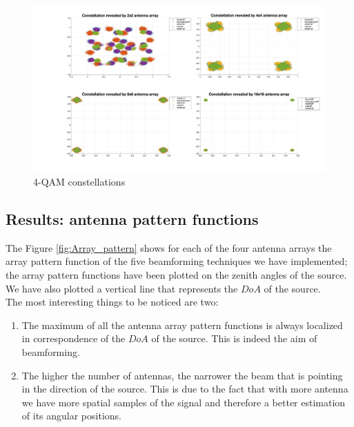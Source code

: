 \begin{figure}[ht]
    \includegraphics[width=\linewidth]{Constellations.jpg}
    \caption{4-QAM constellations}
    \label{fig:Constellations}
\end{figure}

\subsection{Results: antenna pattern functions}

The Figure \ref{fig:Array_pattern} shows for each of the four antenna arrays the array pattern function of the five
beamforming techniques we have implemented; the array pattern functions have been plotted on the zenith angles of the source.
We have also plotted a vertical line that represents the $DoA$ of the source.\\
The most interesting things to be noticed are two:

\begin{enumerate}
    \item The maximum of all the antenna array pattern functions is always localized in correspondence of the $DoA$ of the source.
            This is indeed the aim of beamforming.
    \item The higher the number of antennas, the narrower the beam that is pointing in the direction of the source. This is due 
            to the fact that with more antenna we have more spatial samples of the signal and therefore a better estimation of 
            its angular positions. 
\end{enumerate}

